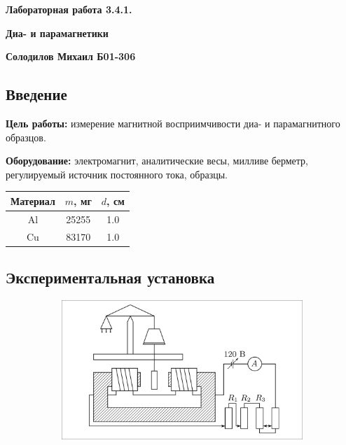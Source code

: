 \documentclass[a4paper, 12pt]{article}
\begin{document}
\begin{center}
    \huge
    \bf{Лабораторная работа 3.4.1.}

    \bf{Диа- и парамагнетики}

    \bf{Солодилов Михаил Б01-306}
\end{center}

\begin{center}
    \section*{Введение}
\end{center}

\noindent \textbf{Цель работы:}
измерение магнитной восприимчивости диа- и парамаг­нитного образцов.

\bigskip

\noindent \textbf{Оборудование:}
электромагнит, аналитические весы, милливе­
берметр, регулируемый источник постоянного тока, образцы.

\centering
\begin{tabular}{|c|c|c|}
    \toprule
    Материал & $m$, мг & $d$, см \\
    \midrule
    Al & 25255 & 1.0 \\
    \midrule
    Cu & 83170 & 1.0 \\
    \bottomrule
\end{tabular}

\bigskip

\subsection*{Экспериментальная установка}

\begin{figure}[H]
    \centering
    \begin{subfigure}{0.9\textwidth}
        \centering
        \includegraphics[width=1\textwidth]{img/Setup.png}
    \end{subfigure}
\end{figure}
\end{document}
